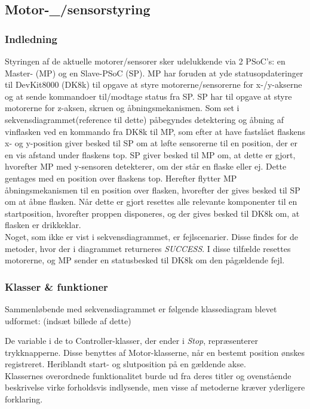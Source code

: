 \subsection{Motor-_/sensorstyring}

\subsubsection{Indledning}
Styringen af de aktuelle motorer/sensorer sker udelukkende via 2 PSoC's: en Master- (MP) og en Slave-PSoC (SP). MP har foruden at yde statusopdateringer til DevKit8000 (DK8k) til opgave at styre motorerne/sensorerne for x-/y-akserne og at sende kommandoer til/modtage status fra SP. SP har til opgave at styre motorerne for z-aksen, skruen og åbningsmekanismen. Som set i sekvensdiagrammet(reference til dette) påbegyndes detektering og åbning af vinflasken ved en kommando fra DK8k til MP, som efter at have fastslået flaskens x- og y-position giver besked til SP om at løfte sensorerne til en position, der er en vis afstand under flaskens top. SP giver besked til MP om, at dette er gjort, hvorefter MP med y-sensoren detekterer, om der står en flaske eller ej. Dette gentages med en position over flaskens top. Herefter flytter MP åbningsmekanismen til en position over flasken, hvorefter der gives besked til SP om at åbne flasken. Når dette er gjort resettes alle relevante komponenter til en startposition, hvorefter proppen disponeres, og der gives besked til DK8k om, at flasken er drikkeklar. \\
Noget, som ikke er vist i sekvensdiagrammet, er fejlscenarier. Disse findes for de metoder, hvor der i diagrammet returneres \textit{SUCCESS}. I disse tilfælde resettes motorerne, og MP sender en statusbesked til DK8k om den pågældende fejl. \\

\subsubsection{Klasser & funktioner}
Sammenløbende med sekvensdiagrammet er følgende klassediagram blevet udformet: (indsæt billede af dette)

De variable i de to Controller-klasser, der ender i \textit{Stop}, repræsenterer trykknapperne. Disse benyttes af Motor-klasserne, når en bestemt position ønskes registreret. Heriblandt start- og slutposition på en gældende akse. \\
Klassernes overordnede funktionalitet burde ud fra deres titler og ovenstående beskrivelse virke forholdsvis indlysende, men visse af metoderne kræver yderligere forklaring.

